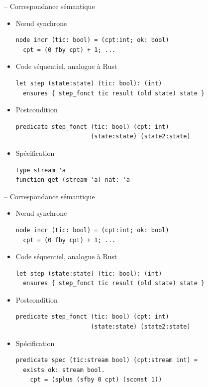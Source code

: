 \documentclass[11pt,usenames,dvipsnames]{beamer}
\begin{document}
\begin{frame}[fragile]{-- Correspondance sémantique}
\begin{itemize}
\item Nœud synchrone
  \begin{lstlisting}[language=minils]
node incr (tic: bool) = (cpt:int; ok: bool)
  cpt = (0 fby cpt) + 1; ...\end{lstlisting}
\item Code séquentiel, analogue à Rust
  \begin{lstlisting}[language=why3]
let step (state:state) (tic: bool): (int)
  ensures { step_fonct tic result (old state) state }\end{lstlisting}
\item Postcondition
  \begin{lstlisting}[language=why3]
predicate step_fonct (tic: bool) (cpt: int)
					 (state:state) (state2:state)\end{lstlisting}
\item Spécification
  \begin{lstlisting}[language=why3]
type stream 'a
function get (stream 'a) nat: 'a
\end{lstlisting}

\end{itemize}
\end{frame}

\begin{frame}[fragile]{-- Correspondance sémantique}
\begin{itemize}
\item Nœud synchrone
  \begin{lstlisting}[language=minils]
node incr (tic: bool) = (cpt:int; ok: bool)
  cpt = (0 fby cpt) + 1; ...\end{lstlisting}
\item Code séquentiel, analogue à Rust
  \begin{lstlisting}[language=why3]
let step (state:state) (tic: bool): (int)
  ensures { step_fonct tic result (old state) state }\end{lstlisting}
\item Postcondition
  \begin{lstlisting}[language=why3]
predicate step_fonct (tic: bool) (cpt: int)
					 (state:state) (state2:state)\end{lstlisting}
\item Spécification
  \begin{lstlisting}[language=why3]
predicate spec (tic:stream bool) (cpt:stream int) =
  exists ok: stream bool.
    cpt = (splus (sfby 0 cpt) (sconst 1))\end{lstlisting}

\end{itemize}
\end{frame}
\end{document}
